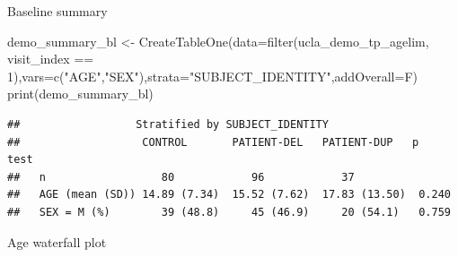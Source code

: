 \documentclass[
]{article}
\newenvironment{Shaded}{\begin{snugshade}}{\end{snugshade}}
\newcommand{\AttributeTok}[1]{\textcolor[rgb]{0.77,0.63,0.00}{#1}}
\newcommand{\DecValTok}[1]{\textcolor[rgb]{0.00,0.00,0.81}{#1}}
\newcommand{\FunctionTok}[1]{\textcolor[rgb]{0.00,0.00,0.00}{#1}}
\newcommand{\NormalTok}[1]{#1}
\newcommand{\OtherTok}[1]{\textcolor[rgb]{0.56,0.35,0.01}{#1}}
\newcommand{\SpecialCharTok}[1]{\textcolor[rgb]{0.00,0.00,0.00}{#1}}
\newcommand{\StringTok}[1]{\textcolor[rgb]{0.31,0.60,0.02}{#1}}
\begin{document}
Baseline summary

\begin{Shaded}
\begin{Highlighting}[]
\NormalTok{demo\_summary\_bl }\OtherTok{\textless{}{-}} \FunctionTok{CreateTableOne}\NormalTok{(}\AttributeTok{data=}\FunctionTok{filter}\NormalTok{(ucla\_demo\_tp\_agelim, visit\_index }\SpecialCharTok{==} \DecValTok{1}\NormalTok{),}\AttributeTok{vars=}\FunctionTok{c}\NormalTok{(}\StringTok{"AGE"}\NormalTok{,}\StringTok{"SEX"}\NormalTok{),}\AttributeTok{strata=}\StringTok{"SUBJECT\_IDENTITY"}\NormalTok{,}\AttributeTok{addOverall=}\NormalTok{F)}
\FunctionTok{print}\NormalTok{(demo\_summary\_bl)}
\end{Highlighting}
\end{Shaded}

\begin{verbatim}
##                  Stratified by SUBJECT_IDENTITY
##                   CONTROL       PATIENT-DEL   PATIENT-DUP   p      test
##   n                  80            96            37                    
##   AGE (mean (SD)) 14.89 (7.34)  15.52 (7.62)  17.83 (13.50)  0.240     
##   SEX = M (%)        39 (48.8)     45 (46.9)     20 (54.1)   0.759
\end{verbatim}

Age waterfall plot
\end{document}
